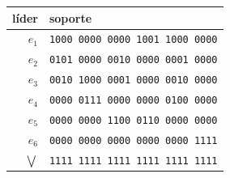 \begin{tabular}{@{}rl@{}}
\toprule
líder & soporte \\
\midrule
$e_{1}$ & \texttt{1000\,0000\,0000\,1001\,1000\,0000} \\
$e_{2}$ & \texttt{0101\,0000\,0010\,0000\,0001\,0000} \\
$e_{3}$ & \texttt{0010\,1000\,0001\,0000\,0010\,0000} \\
$e_{4}$ & \texttt{0000\,0111\,0000\,0000\,0100\,0000} \\
$e_{5}$ & \texttt{0000\,0000\,1100\,0110\,0000\,0000} \\
$e_{6}$ & \texttt{0000\,0000\,0000\,0000\,0000\,1111} \\
\midrule
$\bigvee$ & \texttt{1111\,1111\,1111\,1111\,1111\,1111} \\
\bottomrule
\end{tabular}
